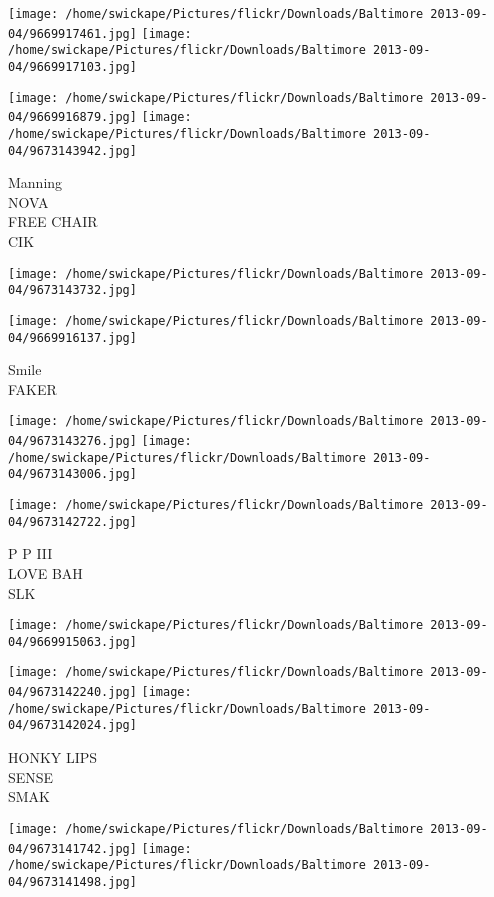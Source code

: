 \documentclass[10pt,letterpaper]{article}
\begin{document}
\texttt{[image: /home/swickape/Pictures/flickr/Downloads/Baltimore 2013-09-04/9669917461.jpg]}
\texttt{[image: /home/swickape/Pictures/flickr/Downloads/Baltimore 2013-09-04/9669917103.jpg]}

\texttt{[image: /home/swickape/Pictures/flickr/Downloads/Baltimore 2013-09-04/9669916879.jpg]}
\texttt{[image: /home/swickape/Pictures/flickr/Downloads/Baltimore 2013-09-04/9673143942.jpg]}

Manning\\
NOVA\\
FREE CHAIR\\
CIK
\pagebreak

\texttt{[image: /home/swickape/Pictures/flickr/Downloads/Baltimore 2013-09-04/9673143732.jpg]}

\vspace{0.25in}
\texttt{[image: /home/swickape/Pictures/flickr/Downloads/Baltimore 2013-09-04/9669916137.jpg]}

Smile\\
FAKER
\pagebreak

\texttt{[image: /home/swickape/Pictures/flickr/Downloads/Baltimore 2013-09-04/9673143276.jpg]}
\texttt{[image: /home/swickape/Pictures/flickr/Downloads/Baltimore 2013-09-04/9673143006.jpg]}

\texttt{[image: /home/swickape/Pictures/flickr/Downloads/Baltimore 2013-09-04/9673142722.jpg]}

P P III\\
LOVE BAH\\
SLK
\pagebreak

\texttt{[image: /home/swickape/Pictures/flickr/Downloads/Baltimore 2013-09-04/9669915063.jpg]}

\vspace{0.25in}
\texttt{[image: /home/swickape/Pictures/flickr/Downloads/Baltimore 2013-09-04/9673142240.jpg]}
\texttt{[image: /home/swickape/Pictures/flickr/Downloads/Baltimore 2013-09-04/9673142024.jpg]}

HONKY LIPS\\
SENSE\\
SMAK
\pagebreak

\texttt{[image: /home/swickape/Pictures/flickr/Downloads/Baltimore 2013-09-04/9673141742.jpg]}
\texttt{[image: /home/swickape/Pictures/flickr/Downloads/Baltimore 2013-09-04/9673141498.jpg]}
\end{document}
